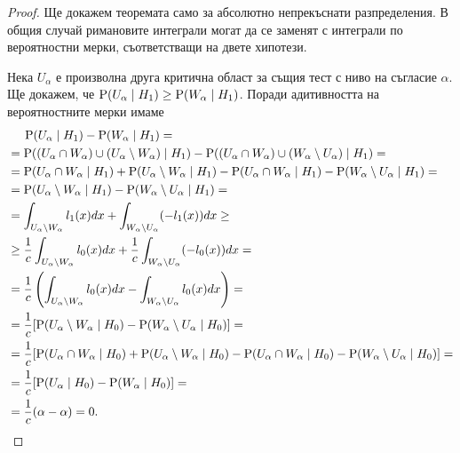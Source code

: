 \documentclass[numbers=endperiod, DIV=15, bibliography=totocnumbered]{scrartcl}
\begin{document}
\begin{proof}
  Ще докажем теоремата само за абсолютно непрекъснати разпределения. В общия случай римановите интеграли могат да се заменят с интеграли по вероятностни мерки, съответстващи на двете хипотези.

  Нека $U_\alpha$ е произволна друга критична област за същия тест с ниво на съгласие $\alpha$. Ще докажем, че $\operatorname{P}(U_\alpha \mid H_1) \geq \operatorname{P}(W_\alpha \mid H_1)$. Поради адитивността на вероятностните мерки имаме
  \begin{align*}
    &\hspace{0.45cm}\operatorname{P}(U_\alpha \mid H_1) - \operatorname{P}(W_\alpha \mid H_1)
    = \\ &=
    \operatorname{P}((U_\alpha \cap W_\alpha) \cup (U_\alpha \setminus W_\alpha) \mid H_1) - \operatorname{P}((U_\alpha \cap W_\alpha) \cup (W_\alpha \setminus U_\alpha) \mid H_1)
    = \\ &=
    \operatorname{P}(U_\alpha \cap W_\alpha \mid H_1) + \operatorname{P}(U_\alpha \setminus W_\alpha \mid H_1) - \operatorname{P}(U_\alpha \cap W_\alpha \mid H_1) - \operatorname{P}(W_\alpha \setminus U_\alpha \mid H_1)
    = \\ &=
    \operatorname{P}(U_\alpha \setminus W_\alpha \mid H_1) - \operatorname{P}(W_\alpha \setminus U_\alpha \mid H_1)
    = \\ &=
    \int_{U_\alpha \setminus W_\alpha} l_1(x) dx + \int_{W_\alpha \setminus U_\alpha} (-l_1(x)) dx
    \geq \\ &\geq
    \frac 1 c \int_{U_\alpha \setminus W_\alpha} l_0(x) dx + \frac 1 c \int_{W_\alpha \setminus U_\alpha} (-l_0(x)) dx
    = \\ &=
    \frac 1 c \left( \int_{U_\alpha \setminus W_\alpha} l_0(x) dx - \int_{W_\alpha \setminus U_\alpha} l_0(x) dx \right)
    = \\ &=
    \frac 1 c [\operatorname{P}(U_\alpha \setminus W_\alpha \mid H_0) - \operatorname{P}(W_\alpha \setminus U_\alpha \mid H_0)]
    = \\ &=
    \frac 1 c [\operatorname{P}(U_\alpha \cap W_\alpha \mid H_0) + \operatorname{P}(U_\alpha \setminus W_\alpha \mid H_0) - \operatorname{P}(U_\alpha \cap W_\alpha \mid H_0) - \operatorname{P}(W_\alpha \setminus U_\alpha \mid H_0)]
    = \\ &=
    \frac 1 c [\operatorname{P}(U_\alpha \mid H_0) - \operatorname{P}(W_\alpha \mid H_0)]
    = \\ &=
    \frac 1 c (\alpha - \alpha)
    =
    0.
  \end{align*}
\end{proof}

\printbibliography
\end{document}
